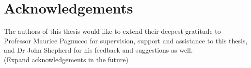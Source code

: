 \chapter*{Acknowledgements}\label{ack}

The authors of this thesis would like to extend their deepest gratitude to Professor Maurice Pagnucco for supervision, support and assistance to this thesis, and Dr John Shepherd for his feedback and suggestions as well. \\

(Expand acknowledgements in the future) \\
